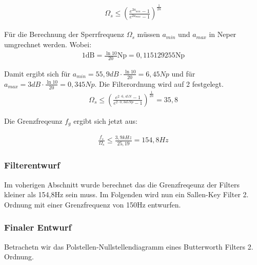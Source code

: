 \documentclass[11pt,twoside,a4paper,openright]{mpreport}
\begin{document}
\begin{align}
\Omega_s \le  \left(\frac{e^{2a_{min}}-1}{e^{2a_{max}}-1}\right)^{\frac{1}{2n}}
\end{align}



Für die Berechnung der Sperrfrequenz $\Omega_s$ müssen  $a_{min}$ und $a_{max}$ in Neper umgrechnet werden. Wobei:
\begin{align*}
1 \text{dB} =  \frac{\ln{10}}{20}\text{Np} = 0,115129255 \text{Np}   
\end{align*}

Damit ergibt sich für $a_{min}=55,9 dB\cdot \frac{\ln{10}}{20}=6,45Np$ und für  $a_{max}=3 dB\cdot \frac{\ln{10}}{20}=0,345Np$. Die Filterordnung wird auf 2 festgelegt.
\begin{align}
\Omega_s \le  \left(\frac{e^{2\cdot6,45N }-1}{e^{2\cdot 0,345Np}-1}\right)^{\frac{1}{2n}}  = 35,8
\end{align}

Die Grenzfreqeunz $f_g$ ergibt sich jetzt aus:

\begin{align}
\frac{f_s}{\Omega_s} \le \frac{3,9kHz}{25,19} = 154,8Hz
\end{align}

\subsubsection{Filterentwurf}
Im voherigen Abschnitt wurde berechnet das die Grenzfreqeunz der Filters kleiner als 154,8Hz sein muss.
Im Folgenden wird nun ein Sallen-Key Filter 2. Ordnung mit einer Grenzfrequenz von 150Hz entwurfen.


\subsubsection{Finaler Entwurf}



Betrachetn wir das Polstellen-Nullstellendiagramm eines Butterworth Filters 2. Ordnung.

\end{document}
